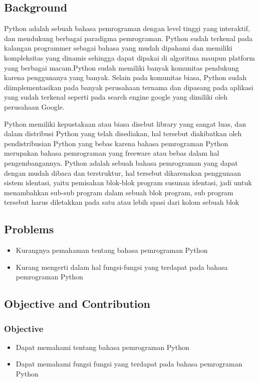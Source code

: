     \subsection{Background}
    \label{Background}
    \par
    Python adalah sebuah bahasa pemrograman dengan level tinggi yang interaktif, dan mendukung berbagai paradigma pemrograman. Python sudah terkenal pada kalangan programmer sebagai bahasa yang mudah dipahami dan memiliki kompleksitas yang dinamis sehingga dapat dipakai di algoritma maupun platform yang berbagai macam.Python sudah memiliki banyak komunitas pendukung karena penggunanya yang banyak. Selain pada komunitas biasa, Python sudah diimplementasikan pada banyak perusahaan ternama dan dipasang pada aplikasi yang sudah terkenal seperti pada search engine google yang dimiliki oleh perusahaan Google. 
    \par
    Python memiliki kepustakaan atau biasa disebut library yang sangat luas, dan dalam distribusi Python yang telah disediakan, hal tersebut diakibatkan oleh pendistribusian Python yang bebas karena bahasa pemrograman Python merupakan bahasa pemrograman yang freeware atau bebas dalam hal pengembangannya. Python adalah sebuah bahasa pemrograman yang dapat dengan mudah dibaca dan terstruktur, hal tersebut dikarenakan penggunaan sistem identasi, yaitu pemisahan blok-blok program susunan identasi, jadi untuk menambahkan sub-sub program dalam sebuah blok program, sub program tersebut harus diletakkan pada satu atau lebih spasi dari kolom sebuah blok 
    \subsection{Problems}
        \begin{itemize}
            \item Kurangnya pemahaman tentang bahasa pemrograman Python
            \item Kurang mengerti dalam hal fungsi-fungsi yang terdapat pada bahasa pemrograman Python
        \end{itemize}

    \subsection{Objective and Contribution}
        \subsubsection{Objective}
            \begin{itemize}
                \item Dapat memahami tentang bahasa pemrograman Python
                \item Dapat memahami fungsi fungsi yang terdapat pada bahasa pemrograman Python
            \end{itemize}

